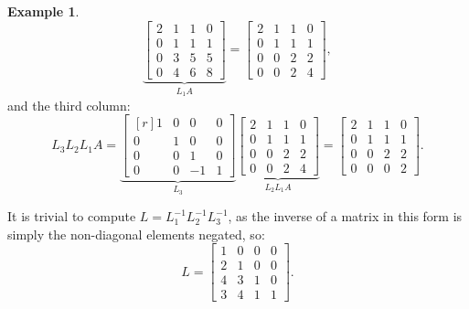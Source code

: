 \documentclass[12pt,letterpaper,DIV=11]{scrartcl}
\theoremstyle{plain}
\theoremstyle{definition}
\newtheorem{example}{Example}[section]
\theoremstyle{remark}
\begin{document}
\begin{example}
\begin{displaymath}
    \underbrace{\begin{bmatrix}
        2 & 1 & 1 & 0 \\
        0 & 1 & 1 & 1 \\
        0 & 3 & 5 & 5 \\
        0 & 4 & 6 & 8
    \end{bmatrix}}_{L_1 A} =
    \begin{bmatrix}
      2 & 1 & 1 & 0 \\
      0 & 1 & 1 & 1 \\
      0 & 0 & 2 & 2 \\
      0 & 0 & 2 & 4
    \end{bmatrix},
  \end{displaymath}
  and the third column: \begin{displaymath}
    L_3 L_2 L_1 A =
    \underbrace{\begin{bmatrix*}[r]
        1 & 0 & 0 & 0 \\
        0 & 1 & 0 & 0 \\
        0 & 0 & 1 & 0 \\
        0 & 0 & -1 & 1
    \end{bmatrix*}}_{L_3}
    \underbrace{\begin{bmatrix}
        2 & 1 & 1 & 0 \\
        0 & 1 & 1 & 1 \\
        0 & 0 & 2 & 2 \\
        0 & 0 & 2 & 4
    \end{bmatrix}}_{L_2 L_1 A} =
    \begin{bmatrix}
      2 & 1 & 1 & 0 \\
      0 & 1 & 1 & 1 \\
      0 & 0 & 2 & 2 \\
      0 & 0 & 0 & 2
    \end{bmatrix}.
  \end{displaymath}
\end{example}
It is trivial to compute $L = L_1^{-1} L_2^{-1} L_3^{-1}$, as the inverse of a matrix in this form is simply the non-diagonal elements negated, so: \begin{displaymath}
  L = \begin{bmatrix}
    1 & 0 & 0 & 0 \\
    2 & 1 & 0 & 0 \\
    4 & 3 & 1 & 0 \\
    3 & 4 & 1 & 1
  \end{bmatrix}.
\end{displaymath}
\end{document}
